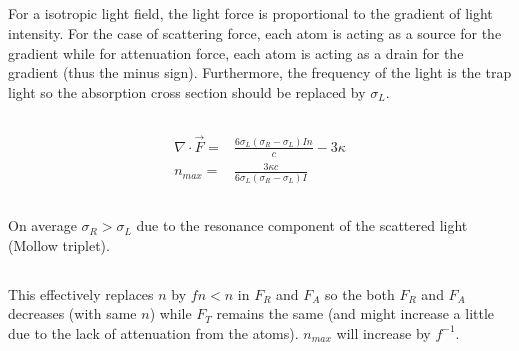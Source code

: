 \documentclass[10pt,fleqn]{article}
\newcommand{\eqar}[1]
{
  \begin{align*}
    #1
  \end{align*}
}
\newcommand{\paren}[1]{{\left({#1}\right)}}
\begin{document}
\subsection{}
For a isotropic light field, the light force is proportional to the gradient of light intensity. For the case of scattering force, each atom is acting as a source for the gradient while for attenuation force, each atom is acting as a drain for the gradient (thus the minus sign). Furthermore, the frequency of the light is the trap light so the absorption cross section should be replaced by $\sigma_L$.

\subsection{}
\eqar{
  \nabla\cdot\vec F=&\frac{6\sigma_L\paren{\sigma_R-\sigma_L}In}{c}-3\kappa\\
  n_{max}=&\frac{3\kappa c}{6\sigma_L\paren{\sigma_R-\sigma_L}I}
}

\subsection{}
On average $\sigma_R>\sigma_L$ due to the resonance component of the scattered light (Mollow triplet).

\subsection{}
This effectively replaces $n$ by $fn<n$ in $F_R$ and $F_A$ so the both $F_R$ and $F_A$ decreases (with same $n$) while $F_T$ remains the same (and might increase a little due to the lack of attenuation from the atoms). $n_{max}$ will increase by $f^{-1}$.
\end{document}
